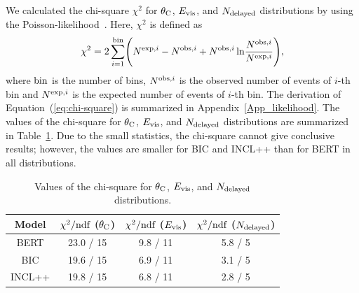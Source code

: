 \hs
We calculated the chi-square $\chi^{2}$ for $\theta_{\rm C}$, $E_{\rm vis}$, and $N_{\rm delayed}$ distributions by using the Poisson-likelihood~\cite{2020Ji}.
Here, $\chi^{2}$ is defined as
\begin{eqnarray}\label{eq:chi-square}
	\chi^{2}=2\sum_{i=1}^{\rm bin} \Biggl(N^{{\rm exp},i} - N^{{\rm obs},i} + N^{{\rm obs},i}\,{\rm ln}{N^{{\rm obs},i} \over N^{{\rm exp},i}}\Biggr),
\end{eqnarray}
where ${\rm bin}$ is the number of bins, $N^{{\rm obs},i}$ is the observed number of events of $i$-th bin and $N^{{\rm exp},i}$ is the expected number of events of $i$-th bin.
The derivation of Equation~(\ref{eq:chi-square}) is summarized in Appendix~\ref{App_likelihood}.
The values of the chi-square for $\theta_{\rm C}$, $E_{\rm vis}$, and $N_{\rm delayed}$ distributions are summarized in Table~\ref{tab:chi-square}.
Due to the small statistics, the chi-square cannot give conclusive results; however, the values are smaller for BIC and INCL++ than for BERT in all distributions.

\begin{table}[h]
	\centering
	\caption[Values of the chi-square for $\theta_{\rm C}$, $E_{\rm vis}$, and $N_{\rm delayed}$ distributions]{
	Values of the chi-square for $\theta_{\rm C}$, $E_{\rm vis}$, and $N_{\rm delayed}$ distributions.
	}\label{tab:chi-square}
	\vs
	\begin{tabular}{cccc} \hline \hline
		Model        & $\chi^{2}/{\rm ndf}$ ($\theta_{\rm C}$) & $\chi^{2}/{\rm ndf}$ ($E_{\rm vis}$) & $\chi^{2}/{\rm ndf}$ ($N_{\rm delayed}$) \\ \hline
		BERT         & 23.0 / 15                               & 9.8 / 11                             & 5.8 / 5                                  \\
		BIC          & 19.6 / 15                               & 6.9 / 11                             & 3.1 / 5                                  \\
		INCL++       & 19.8 / 15                               & 6.8 / 11                             & 2.8 / 5                                  \\ \hline \hline
	\end{tabular}
\end{table}

